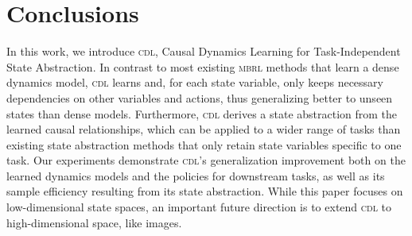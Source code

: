 \section{Conclusions}
\label{sec:conclusions}

In this work, we introduce \textsc{cdl}, Causal Dynamics Learning for Task-Independent State Abstraction. In contrast to most existing \textsc{mbrl} methods that learn a dense dynamics model, \textsc{cdl} learns and, for each state variable, only keeps necessary dependencies on other variables and actions, thus generalizing better to unseen states than dense models. 
Furthermore, \textsc{cdl} derives a state abstraction from the learned causal relationships, which can be applied to a wider range of tasks than existing state abstraction methods that only retain state variables specific to one task. 
Our experiments demonstrate \textsc{cdl}'s generalization improvement both on the learned dynamics models and the policies for downstream tasks, as well as its sample efficiency resulting from its state abstraction. 
While this paper focuses on low-dimensional state spaces, an important future direction is to extend \textsc{cdl} to high-dimensional space, like images.